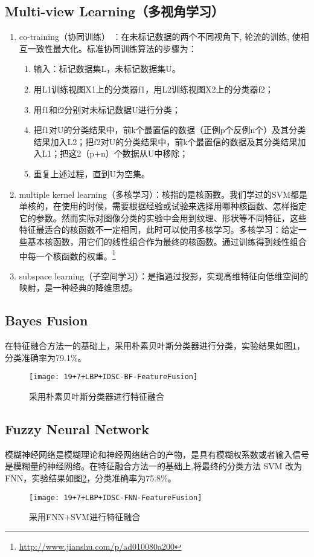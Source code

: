 \subsection{Multi-view Learning（多视角学习）}
\begin{enumerate}
\item co-training（协同训练） ：在未标记数据的两个不同视角下, 轮流的训练, 使相互一致性最大化。标准协同训练算法的步骤为：
    \begin{enumerate}
    \item 输入：标记数据集L，未标记数据集U。
    \item 用L1训练视图X1上的分类器f1，用L2训练视图X2上的分类器f2；
    \item 用f1和f2分别对未标记数据U进行分类；
    \item 把f1对U的分类结果中，前k个最置信的数据（正例p个反例n个）及其分类结果加入L2；把f2对U的分类结果中，前k个最置信的数据及其分类结果加入L1；把这2（p+n）个数据从U中移除；
    \item 重复上述过程，直到U为空集。
    \end{enumerate}
\item multiple kernel learning（多核学习）：核指的是核函数。我们学过的SVM都是单核的，在使用的时候，需要根据经验或试验来选择用哪种核函数、怎样指定它的参数。然而实际对图像分类的实验中会用到纹理、形状等不同特征，这些特征最适合的核函数不一定相同，此时可以使用多核学习。多核学习：给定一些基本核函数，用它们的线性组合作为最终的核函数。通过训练得到线性组合中每一个核函数的权重。\footnote{\url{http://www.jianshu.com/p/ad010080a200}}
\item subspace learning（子空间学习）：是指通过投影，实现高维特征向低维空间的映射，是一种经典的降维思想。
\end{enumerate}

\subsection{Bayes Fusion}
在特征融合方法一的基础上，采用朴素贝叶斯分类器进行分类，实验结果如图\ref{fig:19+7+LBP+IDSC-BF-FeatureFusion}，分类准确率为79.1\%。
\begin{figure}[!ht]
\centering
\texttt{[image: 19+7+LBP+IDSC-BF-FeatureFusion]}
\caption{采用朴素贝叶斯分类器进行特征融合}
\label{fig:19+7+LBP+IDSC-BF-FeatureFusion}
\end{figure}

\subsection{Fuzzy Neural Network}
模糊神经网络是模糊理论和神经网络结合的产物，是具有模糊权系数或者输入信号是模糊量的神经网络。在特征融合方法一的基础上,将最终的分类方法 SVM 改为FNN，实验结果如图\ref{fig:19+7+LBP+IDSC-FNN-FeatureFusion}，分类准确率为75.8\%。
\begin{figure}[!ht]
\centering
\texttt{[image: 19+7+LBP+IDSC-FNN-FeatureFusion]}
\caption{采用FNN+SVM进行特征融合}
\label{fig:19+7+LBP+IDSC-FNN-FeatureFusion}
\end{figure}


